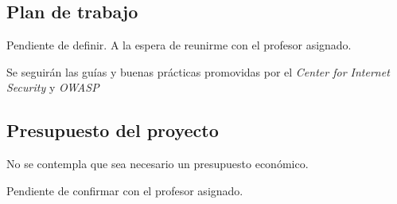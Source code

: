 \subsection{Plan de trabajo}
\par Pendiente de definir. A la espera de reunirme con el profesor asignado.
\par Se seguirán las guías y buenas prácticas promovidas por el {\em Center for Internet Security} y {\em OWASP}
\begin{comment}
    \pfg{desglosarse en tareas y subtareas. Estas irán numeradas
    de una manera indicativa de su jerarquía (por ejemplo: 7, 7.1, 7.1.1, etc.). Para cada tarea o
    subtarea se especificará: interviniente responsable, otros participantes, breve descripción,
    consumo de recursos previsto, dependencias con otras tareas, duración y plazo de ejecución.}
    \pfg{Además se incluirá un cronograma o diagrama de Gantt. Deberán figurar hitos, entre los que se
    considerarán:
    \begin{itemize}
      \item Disponibilidad de versiones preliminares o de prueba.
      \item Disponibilidad de documentación entregable.
      \item Reuniones de evaluación.
    \end{itemize}
    }

    \pfg{Descripción de todo lo que vas a hacer, tecnología a emplear, modelos, patrones, a\-pli\-ca\-cio\-nes anteriores, etc., que centren la idea del trabajo futuro.}

    \pfg{detallar qué vas a hacer y qué metodologías y/o técnicas aplicarás en cada etapa del Proyecto}

    \pfg{Puedes aplicar los principios del proceso software.}

    \pfg{Puedes aplicar metodologías (de desarrollo software), normas (de calidad, etc.) técnicas asociadas al desarrollo de tecnologías, aplicaciones, etc.}
    \begin{itemize}
      \item OWASP
      \item CIS
    \end{itemize}
\end{comment}

\subsection{Presupuesto del proyecto}
\par No se contempla que sea necesario un presupuesto económico.
\par Pendiente de confirmar con el profesor asignado.

